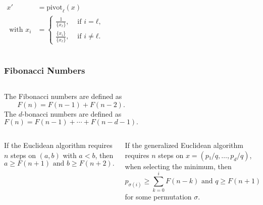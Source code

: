 \documentclass[aspectratio=169]{beamer}
\begin{document}
\begin{frame}
  \begin{columns}

    \begin{align*}
      x' & = \mathrm{pivot}_ℓ(x) \\
      \text{ with } x_i & = \begin{cases}
        \frac{1}{\{x_ℓ\}}, & \text{ if } i = ℓ, \\
        \frac{\{x_i\}}{\{x_ℓ\}}, & \text{ if } i ≠ ℓ.
      \end{cases}
    \end{align*}
  \end{columns}
\end{frame}

\begin{frame}
  \frametitle{Fibonacci Numbers}
  \small
  \begin{columns}[T]
    The Fibonacci numbers are defined as
    \[
      F(n) = F(n - 1) + F(n - 2).
    \]
    The $d$-bonacci numbers are defined as
    \[
      F(n) = F(n - 1) + ⋯ + F(n - d - 1).
    \]
  \end{columns}
  \vspace{1em}
  \begin{columns}[T]
    \begin{theorem}
      If the Euclidean algorithm requires $n$ steps on $(a, b)$ with $a < b$,
      then \[
        a ≥ F(n+1) \text{ and } b ≥ F(n+2).
      \]
    \end{theorem}

    \begin{theorem}
      If the generalized Euclidean algorithm requires $n$ steps on $x = (p₁/q, …, p_d/q)$,
      when selecting the minimum,
      then \[
        p_{σ(i)} ≥ ∑_{k=0}^i F(n-k) \text{ and } q ≥ F(n+1)
      \]
      for some permutation $σ$.
    \end{theorem}
  \end{columns}
\end{frame}
\end{document}
